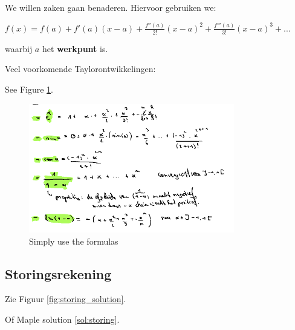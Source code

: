 \documentclass[a4paper]{report}
\begin{document}
We willen zaken gaan benaderen. Hiervoor gebruiken we:

$ f(x) = f(a) + f'(a)(x-a) + \frac{f''(a)}{2!}(x-a)^2 + \frac{f'''(a)}{3!}(x-a)^3 + ... $

waarbij $a$ het \textbf{werkpunt} is.

Veel voorkomende Taylorontwikkelingen:

See Figure \ref{fig:veel_voorkomend_taylor}.

\begin{figure}[htbp!]
	\centering
	\includegraphics[width=0.8\textwidth]{assets/veel_voorkomend_taylor.png}
	\caption{Simply use the formulas}
	\label{fig:veel_voorkomend_taylor}
\end{figure}

\subsection*{Storingsrekening}

Zie Figuur \ref{fig:storing_solution}.

Of Maple solution \ref{sol:storing}.
\end{document}
